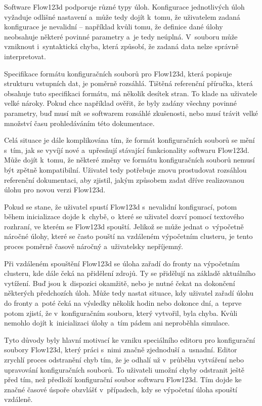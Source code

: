 \documentclass[FM,bw,DP]{tulthesis}
\begin{document}
Software Flow123d podporuje různé typy úloh. Konfigurace jednotlivých úloh vyžaduje odlišné nastavení a~může tedy dojít k~tomu, že uživatelem zadaná konfigurace je nevalidní -- například kvůli tomu, že definice dané úlohy neobsahuje některé povinné parametry a~je tedy neúplná. V~souboru může vzniknout i~syntaktická chyba, která způsobí, že zadaná data nelze správně interpretovat.

Specifikace formátu konfiguračních souborů pro Flow123d, která popisuje strukturu vstupních dat, je poměrně rozsáhlá. Tištěná referenční příručka, která obsahuje tuto specifikaci formátu, má několik desítek stran. To klade na uživatele velké nároky. Pokud chce například ověřit, že byly zadány všechny povinné parametry, buď musí mít se softwarem rozsáhlé zkušenosti, nebo musí trávit velké množství času prohledáváním této dokumentace. 

Celá situace je dále komplikována tím, že formát konfiguračních souborů se mění s~tím, jak se vyvíjí nové a~upřesňují stávající funkcionality softwaru Flow123d. Může dojít k~tomu, že některé změny ve formátu konfiguračních souborů nemusí být zpětně kompatibilní. Uživatel tedy potřebuje znovu prostudovat rozsáhlou referenční dokumentaci, aby zjistil, jakým způsobem zadat dříve realizovanou úlohu pro novou verzi Flow123d.

Pokud se stane, že uživatel spustí Flow123d s~nevalidní konfigurací, potom během inicializace dojde k~chybě, o~které se uživatel dozví pomocí textového rozhraní, ve kterém se Flow123d spouští. Jelikož se může jednat o~výpočetně náročné úlohy, které se často pouští na vzdáleném výpočetním clusteru, je tento proces poměrně časově náročný a~uživatelsky nepříjemný.

Při vzdáleném spouštění Flow123d se úloha zařadí do fronty na výpočetním clusteru, kde dále čeká na přidělení zdrojů. Ty se přidělují na základě aktuálního vytížení. Buď jsou k~dispozici okamžitě, nebo je nutné čekat na dokončení některých předchozích úloh. Může tedy nastat situace, kdy uživatel zařadí úlohu do fronty a~poté čeká na výsledky několik hodin nebo dokonce dní, a~teprve potom zjistí, že v~konfiguračním souboru, který vytvořil, byla chyba. Kvůli nemohlo dojít k~inicializaci úlohy a~tím pádem ani neproběhla simulace.

Tyto důvody byly hlavní motivací ke vzniku speciálního editoru pro konfigurační soubory Flow123d, který práci s~nimi značně zjednoduší a~usnadní. Editor zrychlí proces odstranění chyb tím, že je odhalí už v~průběhu vytváření nebo upravování konfiguračních souborů. To uživateli umožní chyby odstranit ještě před tím, než předloží konfigurační soubor softwaru Flow123d. Tím dojde ke značné časové úspoře obzvlášť v~případech, kdy se výpočetní úloha spouští vzdáleně.
\end{document}
